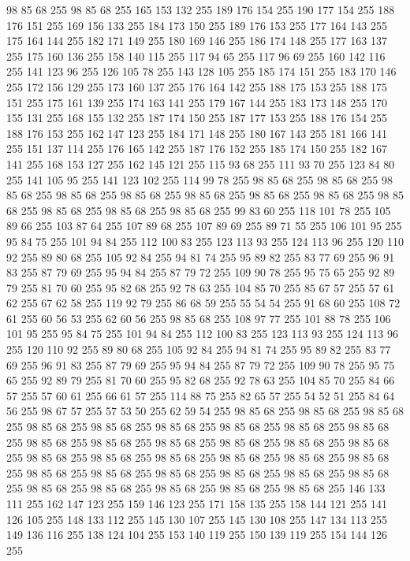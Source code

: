 98 85 68 255 98 85 68 255 165 153 132 255 189 176 154 255 190 177 154 255 188 176 151 255 169 156 133 255 184 173 150 255 189 176 153 255 177 164 143 255 175 164 144 255 182 171 149 255 180 169 146 255 186 174 148 255 177 163 137 255 175 160 136 255 158 140 115 255 117 94 65 255 117 96 69 255 160 142 116 255 141 123 96 255 126 105 78 255 143 128 105 255 185 174 151 255 183 170 146 255 172 156 129 255 173 160 137 255 176 164 142 255 188 175 153 255 188 175 151 255 175 161 139 255 174 163 141 255 179 167 144 255 183 173 148 255 170 155 131 255 168 155 132 255 187 174 150 255 187 177 153 255 188 176 154 255 188 176 153 255 162 147 123 255 184 171 148 255 180 167 143 255 181 166 141 255 151 137 114 255 176 165 142 255 187 176 152 255 185 174 150 255 182 167 141 255 168 153 127 255 162 145 121 255 115 93 68 255 111 93 70 255 123 84 80 255 141 105 95 255 141 123 102 255 114 99 78 255 98 85 68 255 98 85 68 255 98 85 68 255 98 85 68 255 98 85 68 255 98 85 68 255 98 85 68 255
98 85 68 255 98 85 68 255 98 85 68 255 98 85 68 255 98 85 68 255 99 83 60 255 118 101 78 255 105 89 66 255 103 87 64 255 107 89 68 255 107 89 69 255 89 71 55 255 106 101 95 255 95 84 75 255 101 94 84 255 112 100 83 255 123 113 93 255 124 113 96 255 120 110 92 255 89 80 68 255 105 92 84 255 94 81 74 255 95 89 82 255 83 77 69 255 96 91 83 255 87 79 69 255 95 94 84 255 87 79 72 255 109 90 78 255 95 75 65 255 92 89 79 255 81 70 60 255 95 82 68 255 92 78 63 255 104 85 70 255 85 67 57 255 57 61 62 255 67 62 58 255 119 92 79 255 86 68 59 255 55 54 54 255 91 68 60 255 108 72 61 255 60 56 53 255 62 60 56 255 98 85 68 255 108 97 77 255 101 88 78 255 106 101 95 255 95 84 75 255 101 94 84 255 112 100 83 255 123 113 93 255 124 113 96 255 120 110 92 255 89 80 68 255 105 92 84 255 94 81 74 255 95 89 82 255 83 77 69 255 96 91 83 255 87 79 69 255 95 94 84 255 87 79 72 255
109 90 78 255 95 75 65 255 92 89 79 255 81 70 60 255 95 82 68 255 92 78 63 255 104 85 70 255 84 66 57 255 57 60 61 255 66 61 57 255 114 88 75 255 82 65 57 255 54 52 51 255 84 64 56 255 98 67 57 255 57 53 50 255 62 59 54 255 98 85 68 255 98 85 68 255 98 85 68 255 98 85 68 255 98 85 68 255 98 85 68 255 98 85 68 255 98 85 68 255 98 85 68 255 98 85 68 255 98 85 68 255 98 85 68 255 98 85 68 255 98 85 68 255 98 85 68 255 98 85 68 255 98 85 68 255 98 85 68 255 98 85 68 255 98 85 68 255 98 85 68 255 98 85 68 255 98 85 68 255 98 85 68 255 98 85 68 255 98 85 68 255 98 85 68 255 98 85 68 255 98 85 68 255 98 85 68 255 98 85 68 255 98 85 68 255 146 133 111 255 162 147 123 255 159 146 123 255 171 158 135 255 158 144 121 255 141 126 105 255 148 133 112 255 145 130 107 255 145 130 108 255 147 134 113 255 149 136 116 255 138 124 104 255 153 140 119 255 150 139 119 255 154 144 126 255
